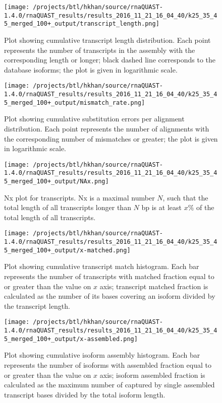 \documentclass[12pt,a4paper]{article}
\begin{document}
\FloatBarrier
\clearpage
{}

\begin{figure}[t]
\centering
\texttt{[image: /projects/btl/hkhan/source/rnaQUAST-1.4.0/rnaQUAST\_results/results\_2016\_11\_21\_16\_04\_40/k25\_35\_45\_merged\_100+\_output/transcript\_length.png]}
\caption{Plot showing cumulative transcript length distribution. Each point represents the number of transcripts in the assembly with the corresponding length or longer; black dashed line corresponds to the database isoforms; the plot is given in logarithmic scale.}
\end{figure}
\FloatBarrier
\clearpage


\begin{figure}[t]
\centering
\texttt{[image: /projects/btl/hkhan/source/rnaQUAST-1.4.0/rnaQUAST\_results/results\_2016\_11\_21\_16\_04\_40/k25\_35\_45\_merged\_100+\_output/mismatch\_rate.png]}
\caption{Plot showing cumulative substitution errors per alignment distribution. Each point represents the number of alignments with the corresponding number of mismatches or greater; the plot is given in logarithmic scale.}
\end{figure}
\FloatBarrier
\clearpage


\begin{figure}[t]
\centering
\texttt{[image: /projects/btl/hkhan/source/rnaQUAST-1.4.0/rnaQUAST\_results/results\_2016\_11\_21\_16\_04\_40/k25\_35\_45\_merged\_100+\_output/NAx.png]}
\caption{Nx plot for transcripts. Nx is a maximal number $N$, such that the total length of all transcripts longer than $N$ bp is at least $x\%$ of the total length of all transcripts.}
\end{figure}
\FloatBarrier
\clearpage


\begin{figure}[t]
\centering
\texttt{[image: /projects/btl/hkhan/source/rnaQUAST-1.4.0/rnaQUAST\_results/results\_2016\_11\_21\_16\_04\_40/k25\_35\_45\_merged\_100+\_output/x-matched.png]}
\caption{Plot showing cumulative transcript match histogram. Each bar represents the number of transcripts with matched fraction equal to or greater than the value on $x$ axis; transcript matched fraction is calculated as the number of its bases covering an isoform divided by the transcript length.}
\end{figure}
\FloatBarrier
\clearpage


\begin{figure}[t]
\centering
\texttt{[image: /projects/btl/hkhan/source/rnaQUAST-1.4.0/rnaQUAST\_results/results\_2016\_11\_21\_16\_04\_40/k25\_35\_45\_merged\_100+\_output/x-assembled.png]}
\caption{Plot showing cumulative isoform assembly histogram. Each bar represents the number of isoforms with assembled fraction equal to or greater than the value on $x$ axis; isoform assembled fraction is calculated as the maximum number of captured by single assembled transcript bases divided by the total isoform length.}
\end{figure}
\FloatBarrier
\clearpage
\end{document}

